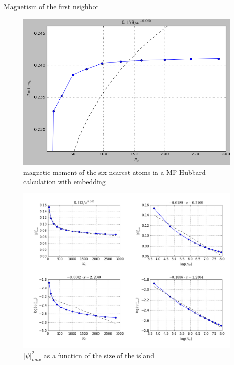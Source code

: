 Magnetism of the first neighbor
\begin{figure}[h!]
\centering
\includegraphics{chapter05/figures/mag_6neig.png}
\vspace{-5pt}
\caption{magnetic moment of the six nearest atoms in a MF Hubbard calculation with embedding}
\end{figure}
\FloatBarrier




\begin{figure}[h!]
\centering
\includegraphics{chapter05/figures/maxfunc_Nc.png}
\vspace{-5pt}
\caption{$|\psi|^2_{max}$ as a function of the size of the island}
\end{figure}
\FloatBarrier





